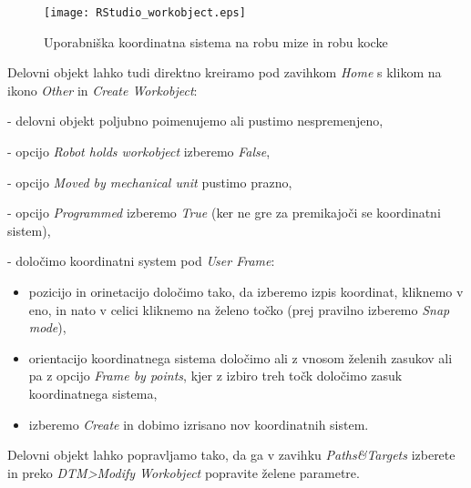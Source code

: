 \begin{figure}[h]
\centering\label{fig:kocka}
\texttt{[image: RStudio\_workobject.eps]}
  \caption{ Uporabniška koordinatna sistema na robu mize in robu kocke}
\end{figure}


\noindent Delovni objekt lahko tudi direktno kreiramo pod zavihkom \emph{Home} s klikom na ikono \emph{Other}
in \emph{Create Workobject}:
\begin{description}
\item \vspace*{-0.2cm} - delovni objekt poljubno poimenujemo ali
pustimo nespremenjeno,

\item \vspace*{-0.2cm} - opcijo \emph{Robot holds workobject}
izberemo \emph{False},

\item \vspace*{-0.2cm}- opcijo \emph{Moved by mechanical unit}
pustimo prazno,

\item \vspace*{-0.2cm}- opcijo \emph{Programmed} izberemo \emph{True}
(ker ne gre za premikajoči se koordinatni sistem), \item
\vspace*{-0.2cm} - določimo koordinatni system pod \emph{User Frame}:
\begin{itemize}
    \item \vspace*{-0.2cm} pozicijo in orinetacijo določimo tako, da izberemo izpis koordinat, kliknemo v eno, in nato v celici kliknemo na želeno točko (prej pravilno izberemo \emph{Snap
    mode}),
    \item \vspace*{-0.2cm} orientacijo koordinatnega sistema določimo ali z vnosom želenih zasukov ali pa z opcijo \emph{Frame by points}, kjer z izbiro treh točk določimo zasuk koordinatnega
    sistema,
    \item \vspace*{-0.2cm} izberemo \emph{Create} in dobimo izrisano nov koordinatnih
    sistem.
\end{itemize}
\end{description}


\noindent Delovni objekt lahko popravljamo tako, da ga v zavihku
\emph{Paths\&Targets} izberete in preko \emph{DTM>Modify Workobject}
popravite želene parametre.

